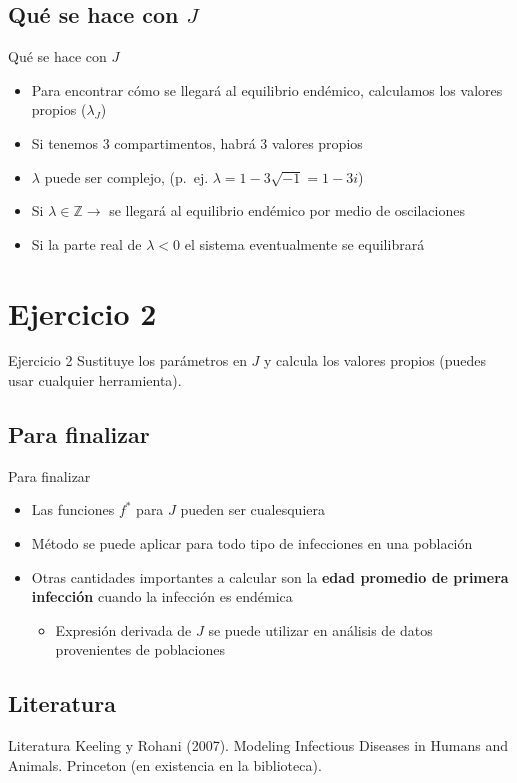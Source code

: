 \documentclass[
  11pt,
  ignorenonframetext,
]{beamer}
\providecommand{\tightlist}{%
  \setlength{\itemsep}{0pt}\setlength{\parskip}{0pt}}
\begin{document}
\hypertarget{quuxe9-se-hace-con-j}{%
\subsection{\texorpdfstring{Qué se hace con
\(J\)}{Qué se hace con J}}\label{quuxe9-se-hace-con-j}}

\begin{frame}{Qué se hace con \(J\)}
\begin{itemize}
\item
  Para encontrar cómo se llegará al equilibrio endémico, calculamos los
  valores propios (\(\lambda_J\))
\item
  Si tenemos 3 compartimentos, habrá 3 valores propios
\item
  \(\lambda\) puede ser complejo, (p.~ej.
  \(\lambda = 1 - 3\sqrt{-1} = 1-3i\))
\item
  Si \(\lambda \in \mathbb{Z} \rightarrow\) se llegará al equilibrio
  endémico por medio de oscilaciones
\item
  Si la parte real de \(\lambda < 0\) el sistema eventualmente se
  equilibrará
\end{itemize}
\end{frame}

\hypertarget{ejercicio-2}{%
\section{Ejercicio 2}\label{ejercicio-2}}

\begin{frame}{Ejercicio 2}
Sustituye los parámetros en \(J\) y calcula los valores propios (puedes
usar cualquier herramienta).
\end{frame}

\hypertarget{para-finalizar}{%
\subsection{Para finalizar}\label{para-finalizar}}

\begin{frame}{Para finalizar}
\begin{itemize}
\item
  Las funciones \(f^*\) para \(J\) pueden ser cualesquiera
\item
  Método se puede aplicar para todo tipo de infecciones en una población
\item
  Otras cantidades importantes a calcular son la \textbf{edad promedio
  de primera infección} cuando la infección es endémica

  \begin{itemize}
  \tightlist
  \item
    Expresión derivada de \(J\) se puede utilizar en análisis de datos
    provenientes de poblaciones
  \end{itemize}
\end{itemize}
\end{frame}

\hypertarget{literatura}{%
\subsection{Literatura}\label{literatura}}

\begin{frame}{Literatura}
Keeling y Rohani (2007). Modeling Infectious Diseases in Humans and
Animals. Princeton (en existencia en la biblioteca).
\end{frame}
\end{document}
